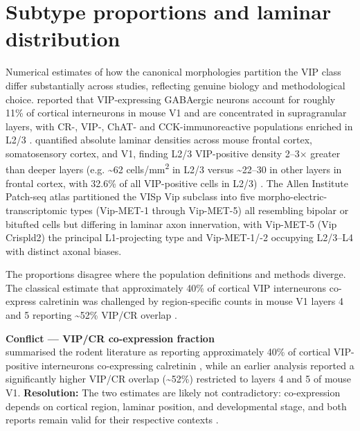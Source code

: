 \documentclass[11pt]{article}
\begin{document}
\section{Subtype proportions and laminar distribution}

Numerical estimates of how the canonical morphologies partition the VIP class differ substantially across studies, reflecting genuine biology and methodological choice. \citet{Gonchar2008} reported that VIP-expressing GABAergic neurons account for roughly 11\% of cortical interneurons in mouse V1 and are concentrated in supragranular layers, with CR-, VIP-, ChAT- and CCK-immunoreactive populations enriched in L2/3 \citep{Gonchar2008, Xu2010a, Rudy2011, Cauli2014}. \citet{Xu2010a} quantified absolute laminar densities across mouse frontal cortex, somatosensory cortex, and V1, finding L2/3 VIP-positive density 2--3$\times$ greater than deeper layers (e.g. {\textasciitilde}62 cells/mm\textsuperscript{2} in L2/3 versus {\textasciitilde}22--30 in other layers in frontal cortex, with 32.6\% of all VIP-positive cells in L2/3) \citep{Xu2010a, Gonchar2008, Pronneke2015, Apicella2022}. The Allen Institute Patch-seq atlas \citep{Gouwens2020a, Gouwens2019, Gliko2024, Gouwens2020b} partitioned the VISp Vip subclass into five morpho-electric-transcriptomic types (Vip-MET-1 through Vip-MET-5) all resembling bipolar or bitufted cells but differing in laminar axon innervation, with Vip-MET-5 (Vip Crispld2) the principal L1-projecting type and Vip-MET-1/-2 occupying L2/3--L4 with distinct axonal biases.

The proportions disagree where the population definitions and methods diverge. The classical estimate that approximately 40\% of cortical VIP interneurons co-express calretinin \citep{Rudy2011, Cauli2014, Cauli1997, Demarcogarcia2011} was challenged by region-specific counts in mouse V1 layers 4 and 5 reporting {\textasciitilde}52\% VIP/CR overlap \citep{Gonchar2008, Rudy2011, Cauli2014}.

\begin{framed}
\textbf{Conflict --- VIP/CR co-expression fraction}\\
\citet{Rudy2011} summarised the rodent literature as reporting approximately 40\% of cortical VIP-positive interneurons co-expressing calretinin \citep{Rudy2011}, while an earlier analysis reported a significantly higher VIP/CR overlap ({\textasciitilde}52\%) restricted to layers 4 and 5 of mouse V1. \textbf{Resolution:} The two estimates are likely not contradictory: co-expression depends on cortical region, laminar position, and developmental stage, and both reports remain valid for their respective contexts \citep{Rudy2011, Demarcogarcia2011}.
\end{framed}
\end{document}
